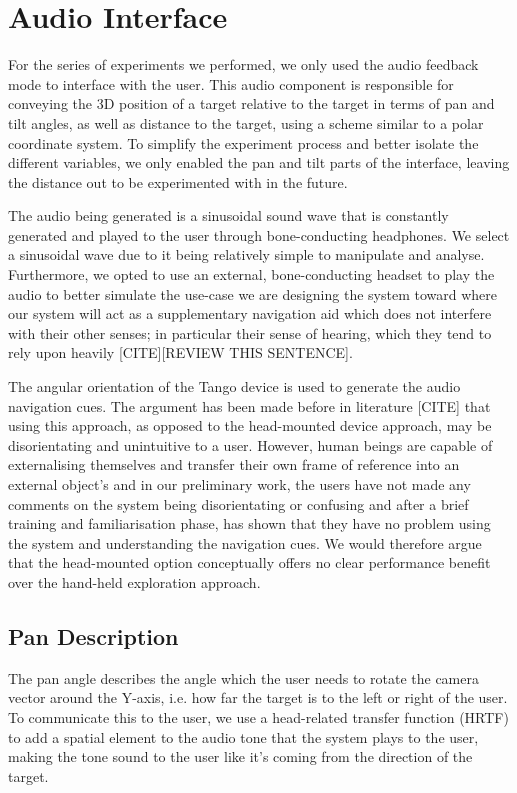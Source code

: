 \documentclass[format=sigconf, review=true, screen=true, anonymous=true]{acmart}
\begin{document}
\section{Audio Interface}

For the series of experiments we performed, we only used the audio feedback mode to interface with the user. This audio component is responsible for conveying the 3D position of a target relative to the target in terms of pan and tilt angles, as well as distance to the target, using a scheme similar to a polar coordinate system. To simplify the experiment process and better isolate the different variables, we only enabled the pan and tilt parts of the interface, leaving the distance out to be experimented with in the future.  

The audio being generated is a sinusoidal sound wave that is constantly generated and played to the user through bone-conducting headphones. We select a sinusoidal wave due to it being relatively simple to manipulate and analyse. Furthermore, we opted to use an external, bone-conducting headset to play the audio to better simulate the use-case we are designing the system toward where our system will act as a supplementary navigation aid which does not interfere with their other senses; in particular their sense of hearing, which they tend to rely upon heavily [CITE][REVIEW THIS SENTENCE].

The angular orientation of the Tango device is used to generate the audio navigation cues. The argument has been made before in literature [CITE] that using this approach, as opposed to the head-mounted device approach, may be disorientating and unintuitive to a user. However, human beings are capable of externalising themselves and transfer their own frame of reference into an external object's and in our preliminary work, the users have not made any comments on the system being disorientating or confusing and after a brief training and familiarisation phase, has shown that they have no problem using the system and understanding the navigation cues. We would therefore argue that the head-mounted option conceptually offers no clear performance benefit over the hand-held exploration approach. 

\subsection{Pan Description}

The pan angle describes the angle which the user needs to rotate the camera vector around the Y-axis, i.e. how far the target is to the left or right of the user. To communicate this to the user, we use a head-related transfer function (HRTF) to add a spatial element to the audio tone that the system plays to the user, making the tone sound to the user like it's coming from the direction of the target. 
\end{document}
